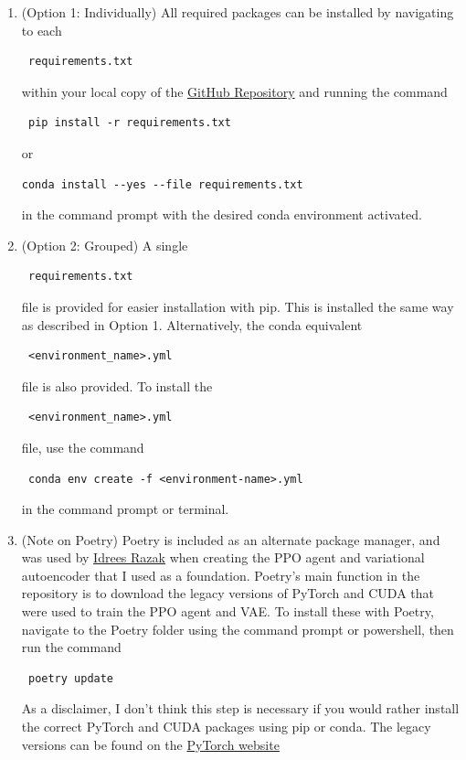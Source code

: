 \documentclass[12pt,oneside,letterpaper]{article}
\begin{document}
\begin{enumerate}
\item(Option 1: Individually) All required packages can be installed by navigating to each \begin{verbatim} requirements.txt \end{verbatim} within your local copy of the \href{https://github.com/hrwhite21/RL_CARLA_ADAS}{GitHub Repository} and running the command \begin{verbatim} pip install -r requirements.txt \end{verbatim} or \begin{verbatim}conda install --yes --file requirements.txt \end{verbatim} in the command prompt with the desired conda environment activated.
\item(Option 2: Grouped) A single \begin{verbatim} requirements.txt \end{verbatim} file is provided for easier installation with pip. This is installed the same way as described in Option 1. Alternatively, the conda equivalent \begin{verbatim} <environment_name>.yml \end{verbatim} file is also provided. To install the \begin{verbatim} <environment_name>.yml \end{verbatim} file, use the command \begin{verbatim} conda env create -f <environment-name>.yml \end{verbatim} in the command prompt or terminal.
\item(Note on Poetry) Poetry is included as an alternate package manager, and was used by \href{https://github.com/idreesshaikh}{Idrees Razak} when creating the PPO agent and variational autoencoder that I used as a foundation. Poetry's main function in the repository is to download the legacy versions of PyTorch and CUDA that were used to train the PPO agent and VAE. To install these with Poetry, navigate to the Poetry folder using the command prompt or powershell, then run the command \begin{verbatim} poetry update \end{verbatim} As a disclaimer, I don't think this step is necessary if you would rather install the correct PyTorch and CUDA packages using pip or conda. The legacy versions can be found on the \href{https://pytorch.org/get-started/previous-versions/}{PyTorch website}
\end{enumerate} 
\end{document}

